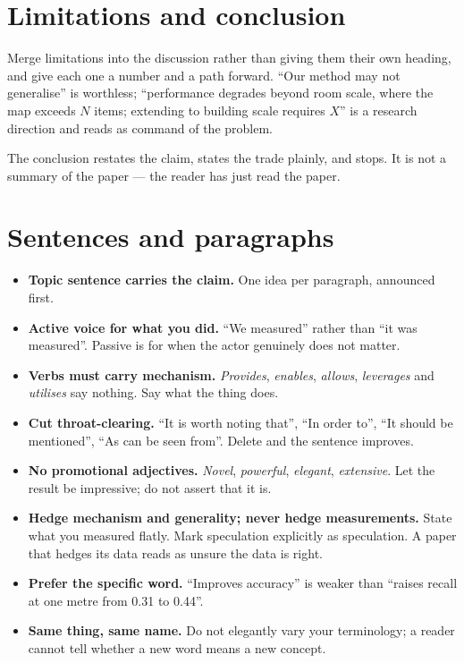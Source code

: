 \documentclass[11pt,a4paper]{article}
\begin{document}
\section{Limitations and conclusion}

Merge limitations into the discussion rather than giving them their own
heading, and give each one a number and a path forward. ``Our method may not
generalise'' is worthless; ``performance degrades beyond room scale, where the
map exceeds $N$ items; extending to building scale requires $X$'' is a
research direction and reads as command of the problem.

The conclusion restates the claim, states the trade plainly, and stops. It is
not a summary of the paper --- the reader has just read the paper.

\section{Sentences and paragraphs}

\begin{itemize}
  \item \textbf{Topic sentence carries the claim.} One idea per paragraph,
    announced first.
  \item \textbf{Active voice for what you did.} ``We measured'' rather than
    ``it was measured''. Passive is for when the actor genuinely does not
    matter.
  \item \textbf{Verbs must carry mechanism.} \emph{Provides}, \emph{enables},
    \emph{allows}, \emph{leverages} and \emph{utilises} say nothing. Say what
    the thing does.
  \item \textbf{Cut throat-clearing.} ``It is worth noting that'', ``In order
    to'', ``It should be mentioned'', ``As can be seen from''. Delete and the
    sentence improves.
  \item \textbf{No promotional adjectives.} \emph{Novel}, \emph{powerful},
    \emph{elegant}, \emph{extensive}. Let the result be impressive; do not
    assert that it is.
  \item \textbf{Hedge mechanism and generality; never hedge measurements.}
    State what you measured flatly. Mark speculation explicitly as
    speculation. A paper that hedges its data reads as unsure the data is
    right.
  \item \textbf{Prefer the specific word.} ``Improves accuracy'' is weaker
    than ``raises recall at one metre from 0.31 to 0.44''.
  \item \textbf{Same thing, same name.} Do not elegantly vary your
    terminology; a reader cannot tell whether a new word means a new concept.
\end{itemize}
\end{document}
